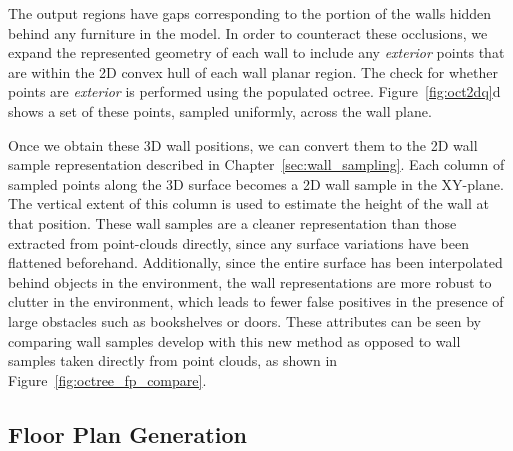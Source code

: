 \documentclass[12pt,onecolumn,oneside]{book}
\begin{document}
The output regions have gaps corresponding to the portion of the walls hidden behind any furniture in the model.  In order to counteract these occlusions, we expand the represented geometry of each wall to include any {\it exterior} points that are within the 2D convex hull of each wall planar region.  The check for whether points are {\it exterior} is performed using the populated octree.  Figure~\ref{fig:oct2dq}d shows a set of these points, sampled uniformly, across the wall plane.  

Once we obtain these 3D wall positions, we can convert them to the 2D wall sample representation described in Chapter~\ref{sec:wall_sampling}.  Each column of sampled points along the 3D surface becomes a 2D wall sample in the XY-plane.  The vertical extent of this column is used to estimate the height of the wall at that position.  These wall samples are a cleaner representation than those extracted from point-clouds directly, since any surface variations have been flattened beforehand.  Additionally, since the entire surface has been interpolated behind objects in the environment, the wall representations are more robust to clutter in the environment, which leads to fewer false positives in the presence of large obstacles such as bookshelves or doors.  These attributes can be seen by comparing wall samples develop with this new method as opposed to wall samples taken directly from point clouds, as shown in Figure~\ref{fig:octree_fp_compare}.

\subsection{Floor Plan Generation}
\label{ssec:octree_floorplan}
\end{document}
